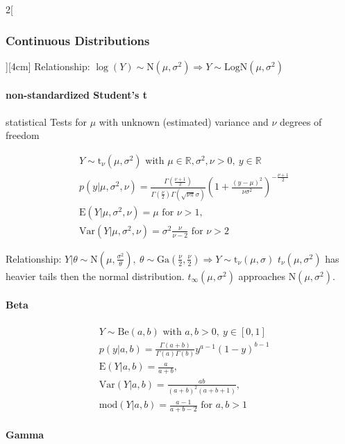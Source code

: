 \documentclass[8pt]{extarticle}
\begin{document}
\begin{multicols}{2}[\subsubsection{Continuous Distributions}][4cm]
\noindent Relationship: $\log (Y) \sim \mathrm{N}(\mu, \sigma^2) \Rightarrow Y \sim \mathrm{LogN}(\mu, \sigma^2)$
  
    \paragraph{non-standardized Student's t} statistical Tests for $\mu$ with unknown (estimated) variance and $\nu$ degrees of freedom
  
    \begin{align*}
    & Y \sim \mathrm{t}_\nu(\mu, \sigma^2) \text{ with } \mu \in \mathbb{R}, \sigma^2, \nu > 0,\: y \in \mathbb{R}\\
    & p(y|\mu, \sigma^2, \nu) =\frac{\Gamma \left( \frac{\nu + 1}{2}\right) }{\Gamma (\frac{\nu}{2}) \Gamma (\sqrt{\nu\pi}\sigma)} \left(1+ \frac{(y-\mu)^2}{\nu \sigma^2} \right)^{-\frac{\nu + 1}{2}} \\
    & \mathrm{E}(Y|\mu, \sigma^2, \nu) = \mu \text{ for }  \nu > 1,\\
    & \mathrm{Var}(Y|\mu, \sigma^2, \nu) = \sigma^2 \frac{\nu}{\nu-2} \text{ for }  \nu > 2
  \end{align*}
  
 \noindent Relationship: $Y|\theta \sim \mathrm{N}(\mu, \frac{\sigma^2}{\theta}), \: \theta \sim  \mathrm{Ga}(\frac{\nu}{2}, \frac{\nu}{2}) \Rightarrow Y \sim \mathrm{t}_\nu(\mu, \sigma)$ 
 $t_\nu(\mu,\sigma^2)$ has heavier tails then the normal distribution. $t_\infty(\mu,\sigma^2)$ approaches $\mathrm{N}(\mu,\sigma^2)$.
  
	\paragraph{Beta}
  
    \begin{align*}
    & Y \sim \mathrm{Be}(a, b) \text{ with } a,b > 0,\: y \in \left[0,1\right]\\
    & p(y|a, b) =\frac{\Gamma \left( a+b\right) }{\Gamma (a) \Gamma (b)} y^{a-1} (1-y)^{b-1} \\
    & \mathrm{E}(Y|a, b) = \frac{a}{a+b},\\
    & \mathrm{Var}(Y|a, b) = \frac{ab}{\left(a+b\right)^2(a+b+1)}, \\
    & \mathrm{mod}(Y|a, b) = \frac{a-1}{a+b-2} \text{ for } a,b > 1
  \end{align*}
  
  
  	\paragraph{Gamma}
  

\end{multicols}
\end{document}
